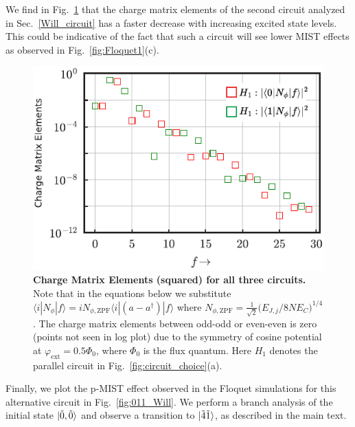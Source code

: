\documentclass[%
reprint,
superscriptaddress,
 amsmath,amssymb,
 aps,
 prx,
longbibliography,
floatfix,
]{revtex4-2}
\begin{document}
We find in Fig.~\ref{fig:charge-matrix-Will} that the charge matrix elements of the second circuit analyzed in Sec.~\ref{Will_circuit} has a faster decrease with increasing excited state levels. This could be indicative of the fact that such a circuit will see lower MIST effects as observed in Fig.~\ref{fig:Floquet1}(c). 
\begin{figure}[htb]
    \centering
    \includegraphics[width=\linewidth]{Supp_Fig/Charge-matrix-Will.pdf}
    \caption{{\bf Charge Matrix 
 Elements (squared) for all three circuits.} Note that in the equations below we substitute $\langle i|N_\phi|f\rangle=iN_{\phi,\mathrm{ZPF}}\langle i|(a-a^\dagger)|f\rangle$ where $N_{\phi,\mathrm{ZPF}}=\frac{1}{\sqrt{2}}\Big(E_{J,j}/8NE_C\Big)^{1/4}$. The charge matrix elements between odd-odd or even-even is zero (points not seen in log plot) due to the symmetry of cosine potential at $\varphi_\mathrm{ext}=0.5\Phi_0$, where $\Phi_0$ is the flux quantum. Here $H_1$ denotes the parallel circuit in Fig.~\ref{fig:circuit_choice}(a).}
    \label{fig:charge-matrix-Will}
\end{figure}

Finally, we plot the p-MIST effect observed in the Floquet simulations for this alternative circuit in Fig.~\ref{fig:011_Will}. We perform a branch analysis of the initial state $\ket{\tilde{0}, \tilde{0}}$ and observe a transition to $\ket{\tilde{4}\tilde{1}}$, as described in the main text. 
\end{document}
